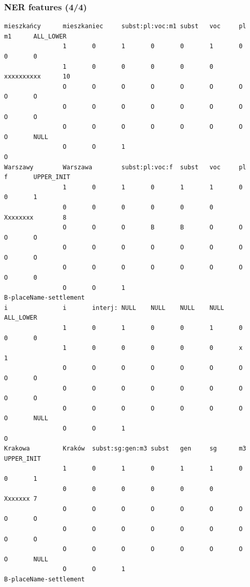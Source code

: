\documentclass[Warsaw]{beamer}
\begin{document}
\begin{frame}[fragile]
    \frametitle{NER features (4/4)}
    \tiny
    \begin{verbatim}
mieszkańcy      mieszkaniec     subst:pl:voc:m1 subst   voc     pl      m1      ALL_LOWER       
                1       0       1       0       0       1       0       0       0       
                1       0       0       0       0       0       xxxxxxxxxx      10      
                O       O       O       O       O       O       O       O       O       
                O       O       O       O       O       O       O       O       O       
                O       O       O       O       O       O       O       O       NULL    
                O       O       1                                               O
Warszawy        Warszawa        subst:pl:voc:f  subst   voc     pl      f       UPPER_INIT      
                1       0       1       0       1       1       0       0       1       
                0       0       0       0       0       0       Xxxxxxxx        8       
                O       O       O       B       B       O       O       O       O       
                O       O       O       O       O       O       O       O       O       
                O       O       O       O       O       O       O       O       0       
                O       O       1                                               B-placeName-settlement
i               i       interj: NULL    NULL    NULL    NULL    ALL_LOWER       
                1       0       1       0       0       1       0       0       0       
                1       0       0       0       0       0       x       1       
                O       O       O       O       O       O       O       O       O       
                O       O       O       O       O       O       O       O       O       
                O       O       O       O       O       O       O       O       NULL    
                O       O       1                                               O
Krakowa         Kraków  subst:sg:gen:m3 subst   gen     sg      m3      UPPER_INIT      
                1       0       1       0       1       1       0       0       1       
                0       0       0       0       0       0       Xxxxxxx 7       
                O       O       O       O       O       O       O       O       O       
                O       O       O       O       O       O       O       O       O       
                O       O       O       O       O       O       O       O       NULL    
                O       O       1                                               B-placeName-settlement
    \end{verbatim}
\end{frame}
\end{document}
